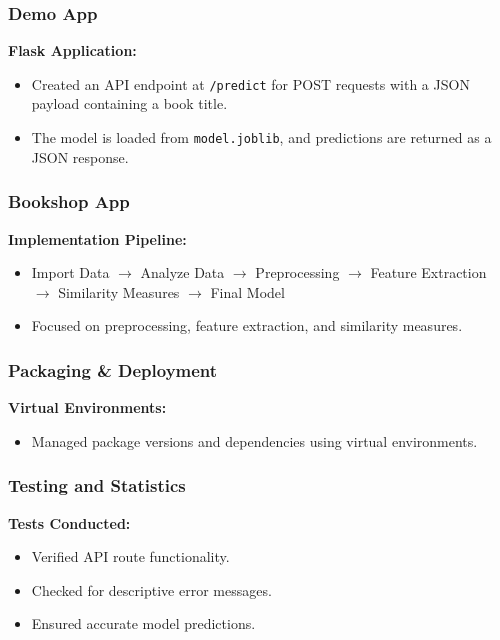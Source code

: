 \documentclass{article}
\begin{document}
\subsubsection{Demo App}

\textbf{Flask Application:}
\begin{itemize}
    \item Created an API endpoint at \texttt{/predict} for POST requests with a JSON payload containing a book title.
    \item The model is loaded from \texttt{model.joblib}, and predictions are returned as a JSON response.
\end{itemize}

\subsubsection{Bookshop App}

\textbf{Implementation Pipeline:}
\begin{itemize}
    \item Import Data $\rightarrow$ Analyze Data $\rightarrow$ Preprocessing $\rightarrow$ Feature Extraction $\rightarrow$ Similarity Measures $\rightarrow$ Final Model
    \item Focused on preprocessing, feature extraction, and similarity measures.
\end{itemize}

\subsubsection{Packaging \& Deployment}

\textbf{Virtual Environments:}
\begin{itemize}
    \item Managed package versions and dependencies using virtual environments.
\end{itemize}

\subsubsection{Testing and Statistics}

\textbf{Tests Conducted:}
\begin{itemize}
    \item Verified API route functionality.
    \item Checked for descriptive error messages.
    \item Ensured accurate model predictions.
\end{itemize}
\end{document}
